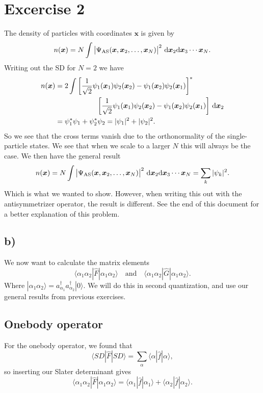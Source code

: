 \documentclass[a4paper, 11pt, notitlepage, english]{article}
\newcommand{\ket}[1]{|#1 \rangle}
\newcommand{\op}[1]{\hat{#1}}
\newcommand{\braopket}[3]{\langle #1 | {#2} | #3 \rangle}
\renewcommand{\d}{{\rm d}}
\newcommand{\bt}[1]{\boldsymbol{#1}}
\begin{document}
\section*{Excercise 2}
The density of particles with coordinates $\bt{x}$ is given by
$$n(\bt x) = N \int \big|\Psi_{\rm AS}(\bt{x}, \bt{x}_2, \ldots, \bt{x}_N)\big|^2 \ \d \bt{x}_2\d \bt{x}_3\cdots\bt{x}_N.$$
Writing out the SD for $N=2$ we have
\begin{align*}
n(\bt{x}) &= 2 \int \bigg[\frac{1}{\sqrt{2}}\psi_1(\bt{x}_1)\psi_2(\bt{x}_2) - \psi_1(\bt{x}_2)\psi_2(\bt{x}_1)\bigg]^* \\
&\qquad\qquad\qquad \bigg[\frac{1}{\sqrt{2}}\psi_1(\bt{x}_1)\psi_2(\bt{x}_2) - \psi_1(\bt{x}_2)\psi_2(\bt{x}_1)\bigg] \ \d \bt{x}_2 \\
&= \psi_1^*\psi_1 +  \psi_2^*\psi_2 = |\psi_1|^2 + |\psi_2|^2.
\end{align*}
So we see that the cross terms vanish due to the orthonormality of the single-particle states. We see that when we scale to a larger $N$ this will always be the case. We then have the general result
$$n(\bt x) = N \int \big|\Psi_{\rm AS}(\bt{x}, \bt{x}_2, \ldots, \bt{x}_N)\big|^2 \ \d \bt{x}_2\d \bt{x}_3\cdots\bt{x}_N = \sum_k |\psi_k|^2.$$
Which is what we wanted to show. However, when writing this out with the antisymmetrizer operator, the result is different. See the end of this document for a better explanation of this problem.


\subsection*{b)}
We now want to calculate the matrix elements
$$\braopket{\alpha_1 \alpha_2}{\op{F}}{\alpha_1 \alpha_2} \quad \mbox{and} \quad \braopket{\alpha_1 \alpha_2}{\op{G}}{\alpha_1 \alpha_2}.$$
Where $\ket{\alpha_1\alpha_2} = a_{\alpha_1}^\dag a_{\alpha_2}^\dag\ket{0}$. We will do this in second quantization, and use our general results from previous exercises.

\subsection*{Onebody operator}
For the onebody operator, we found that
$$\braopket{SD}{\op{F}}{SD} = \sum_\alpha \braopket{\alpha}{\op{f}}{\alpha},$$
so inserting our Slater determinant gives
$$\braopket{\alpha_1 \alpha_2}{\op{F}}{\alpha_1 \alpha_2} = \braopket{\alpha_1}{\op{f}}{\alpha_1} + \braopket{\alpha_2}{\op{f}}{\alpha_2}.$$
\end{document}

